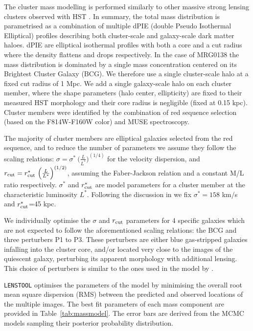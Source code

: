 \documentclass[12pt,dvipsnames]{article}
\def\lenstool{{\tt LENSTOOL}\xspace}
\begin{document}
The cluster mass modelling is performed similarly to other massive strong lensing clusters observed with HST \cite{richard_mass_2014}. In summary, the total mass distribution is parametrised as a combination of multiple dPIE (double Pseudo Isothermal Elliptical) profiles describing both cluster-scale and galaxy-scale dark matter haloes. dPIE are elliptical isothermal profiles with both a core and a cut radius where the density flattens and drops respectively. In the case of MRG0138 the mass distribution is dominated by a single mass concentration centered on its Brightest Cluster Galaxy (BCG). We therefore use a single cluster-scale halo at a fixed cut radius of 1 Mpc.  We add a single galaxy-scale halo on each cluster member, where the shape parameters (halo center, ellipticity) are fixed to their measured HST morphology and their core radius is negligible (fixed at 0.15 kpc). Cluster members were identified by the combination of red sequence selection (based on the F814W-F160W color) and MUSE spectroscopy.

The majority of cluster members are elliptical galaxies selected from the red sequence, and to reduce the number of parameters we assume they follow the scaling relations: $\sigma=\sigma^*\ {\Big(\frac{L}{L^*}\Big)}^{(1/4)}$ for the velocity dispersion, 
and $r_{\rm cut}=r_{\rm cut}^*\ {\Big(\frac{L}{L^*}\Big)}^{(1/2)}$, assuming the Faber-Jackson relation and a constant M/L ratio respectively. $\sigma^*$ and $r^*_{\rm cut}$ are model parameters for a cluster member at the characteristic luminosity $L^*$.  Following the discussion in \cite{richard_locuss_2010} we fix $\sigma^*=158$ km/s and $r_{\rm cut}^*$=45 kpc. 

We individually optimise the $\sigma$ and $r_{\rm cut}$ parameters for 4 specific galaxies which are not expected to follow the aforementioned scaling relations: the BCG and three perturbers P1 to P3. These perturbers are either blue gas-stripped galaxies infalling into the cluster core, and/or located very close to the images of the quiescent galaxy, perturbing its apparent morphology with additional lensing. This choice of perturbers is similar to the ones used in the model by \cite{newman_resolving_2018}.

\lenstool optimises the parameters of the model by minimising the overall root mean square dispersion (RMS) between the predicted and observed locations of the multiple images. The best fit parameters of each mass component are provided in Table~\ref{tab:massmodel}. The error bars are derived from the MCMC models sampling their posterior probability distribution. 
\end{document}
